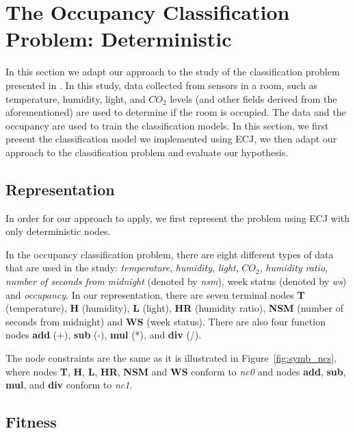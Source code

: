 \section{The Occupancy Classification Problem: Deterministic}

In this section we adapt our approach to the study of the classification problem presented in \cite{Candanedo201628}. In this study, data collected from sensors in a room, such as temperature, humidity, light, and $CO_2$ levels (and other fields derived from the aforementioned) are used to determine if the room is occupied. The data and the occupancy are used to train the classification models. In this section, we first present the classification model we implemented using ECJ, we then adapt our approach to the classification problem and evaluate our hypothesis.

\subsection{Representation}
In order for our approach to apply, we first represent the problem using ECJ with only deterministic nodes. 

In the occupancy classification problem, there are eight different types of data that are used in the study: \emph{temperature}, \emph{humidity}, \emph{light}, $CO_2$, \emph{humidity ratio}, \emph{number of seconds from midnight} (denoted by \emph{nsm}), week status (denoted by \emph{ws}) and \emph{occupancy}. In our representation, there are seven terminal nodes \textbf{T} (temperature), \textbf{H} (humidity), \textbf{L} (light), \textbf{HR} (humidity ratio), \textbf{NSM} (number of seconds from midnight) and \textbf{WS} (week status). There are also four function nodes \textbf{add} (+), \textbf{sub} (-), \textbf{mul} (*), and \textbf{div} (/). 

The node constraints are the same as it is illustrated in Figure~\ref{fig:symb_ncs}, where nodes \textbf{T}, \textbf{H}, \textbf{L}, \textbf{HR}, \textbf{NSM} and \textbf{WS} conform to \emph{nc0} and nodes \textbf{add}, \textbf{sub}, \textbf{mul}, and \textbf{div} conform to \emph{nc1}.

\subsection{Fitness}


